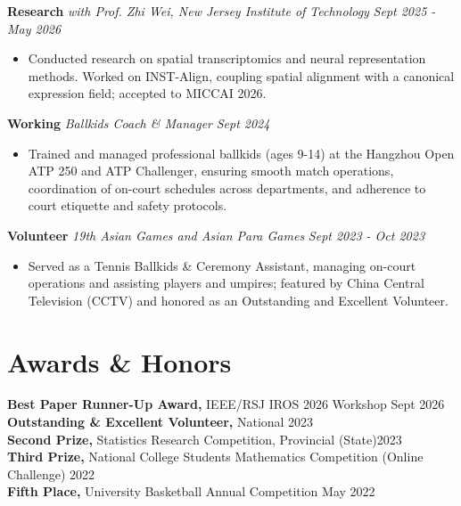 \documentclass[10pt, letterpaper]{article}
\begin{document}
\textbf{Research} \textit{with Prof. Zhi Wei, New Jersey Institute of Technology} \hfill \textit{Sept 2025 - May 2026}
\begin{itemize}[leftmargin=2.0em, itemsep=1pt, topsep=1pt]
    \item Conducted research on spatial transcriptomics and neural representation methods. Worked on INST-Align, coupling spatial alignment with a canonical expression field; accepted to MICCAI 2026.
\end{itemize}

\textbf{Working} \textit{Ballkids Coach \& Manager} \hfill \textit{Sept 2024}
\begin{itemize}[leftmargin=2.0em, itemsep=0pt, topsep=2pt]
    \item Trained and managed professional ballkids (ages 9-14) at the Hangzhou Open ATP 250 and ATP Challenger, ensuring smooth match operations, coordination of on-court schedules across departments, and adherence to court etiquette and safety protocols.
\end{itemize}

\textbf{Volunteer} \textit{19th Asian Games and Asian Para Games} \hfill \textit{Sept 2023 - Oct 2023}
\begin{itemize}[leftmargin=1.5em, itemsep=0pt, topsep=2pt]
    \item Served as a Tennis Ballkids \& Ceremony Assistant, managing on-court operations and assisting players and umpires; featured by China Central Television (CCTV) and honored as an Outstanding and Excellent Volunteer.
\end{itemize}






\section{Awards \& Honors}
\textbf{Best Paper Runner-Up Award,} IEEE/RSJ IROS 2026 Workshop \hfill Sept 2026 \\
\textbf{Outstanding \& Excellent Volunteer,} National \hfill 2023 \\
\textbf{Second Prize,} Statistics Research Competition, Provincial (State)\hfill 2023 \\
\textbf{Third Prize,} National College Students Mathematics Competition (Online Challenge) \hfill 2022 \\
\textbf{Fifth Place,} University Basketball Annual Competition \hfill May 2022 \\
\end{document}
